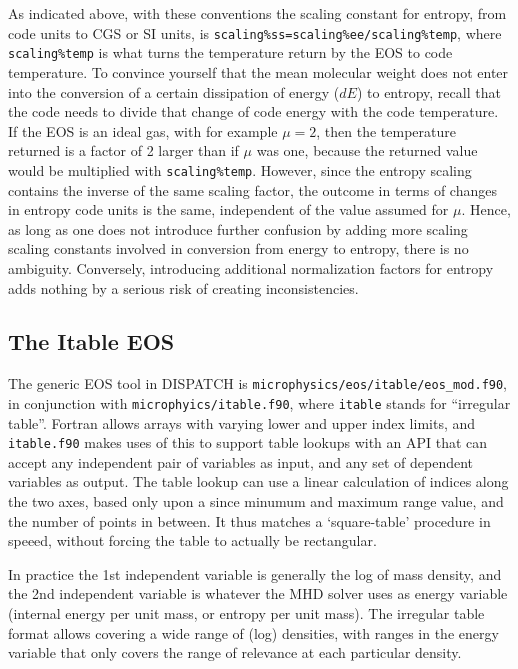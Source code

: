 \documentclass[paper=a4,fontsize=11pt]{scrartcl}
\numberwithin{equation}{section}		%
\numberwithin{figure}{section}			%
\numberwithin{table}{section}				%
\newcommand{\codecolor}{\color{Blue}}
\newcommand{\Code}[1]{{\codecolor\texttt{#1}}}
\begin{document}
As indicated above, with these conventions the scaling constant for entropy, from code units to CGS or SI units, is \Code{scaling\%ss=scaling\%ee/scaling\%temp}, where \Code{scaling\%temp} is what turns the temperature return by the EOS to code temperature.  To convince yourself that the mean molecular weight does not enter into the conversion of a certain dissipation of energy ($dE$) to entropy, recall that the code needs to divide that change of code energy with the code temperature.  If the EOS is an ideal gas, with for example $\mu=2$, then the temperature returned is a factor of 2 larger than if $\mu$ was one, because the returned value would be multiplied with \Code{scaling\%temp}.   However, since the entropy scaling contains the inverse of the same scaling factor, the outcome in terms of changes in entropy code units is the same, independent of the value assumed for $\mu$.   Hence, as long as one does not introduce further confusion by adding more scaling scaling constants involved in conversion from energy to entropy, there is no ambiguity.   Conversely, introducing additional normalization factors for entropy adds nothing by a serious risk of creating inconsistencies.

\subsection{The Itable EOS}
The generic EOS tool in DISPATCH is \verb|microphysics/eos/itable/eos_mod.f90|, in conjunction with \verb|microphyics/itable.f90|, where \verb|itable| stands for ``irregular table''.   Fortran allows arrays with varying lower and upper index limits, and \verb|itable.f90| makes uses of this to support table lookups with an API that can accept any independent pair of variables as input, and any set of dependent variables as output.
The table lookup can use a linear calculation of indices along the two axes, based only upon a since minumum and maximum range value, and the number of points in between.  It thus matches a `square-table' procedure in speeed, without forcing the table to actually be rectangular.

In practice the 1st independent variable is generally the log of mass density, and the 2nd independent variable is whatever the MHD solver uses as energy variable (internal energy per unit mass, or entropy per unit mass). The irregular table format allows covering a wide range of (log) densities, with ranges in the energy variable that only covers the range of relevance at each particular density.
    
\end{document}
